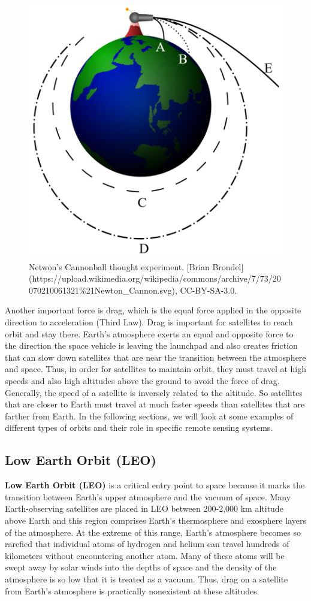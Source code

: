 \documentclass[
]{book}
\begin{document}
\begin{figure}
\includegraphics[width=0.75\linewidth]{images/12-newtons-cannonball} \caption{Netwon's Cannonball thought experiment. [Brian Brondel](https://upload.wikimedia.org/wikipedia/commons/archive/7/73/20070210061321\%21Newton_Cannon.svg), CC-BY-SA-3.0.}\label{fig:12-newtons-cannonball}
\end{figure}

Another important force is drag, which is the equal force applied in the opposite direction to acceleration (Third Law). Drag is important for satellites to reach orbit and stay there. Earth's atmosphere exerts an equal and opposite force to the direction the space vehicle is leaving the launchpad and also creates friction that can slow down satellites that are near the transition between the atmosphere and space. Thus, in order for satellites to maintain orbit, they must travel at high speeds and also high altitudes above the ground to avoid the force of drag. Generally, the speed of a satellite is inversely related to the altitude. So satellites that are closer to Earth must travel at much faster speeds than satellites that are farther from Earth. In the following sections, we will look at some examples of different types of orbits and their role in specific remote sensing systems.

\subsection{Low Earth Orbit (LEO)}\label{low-earth-orbit-leo}

\textbf{Low Earth Orbit (LEO)} is a critical entry point to space because it marks the transition between Earth's upper atmosphere and the vacuum of space. Many Earth-observing satellites are placed in LEO between 200-2,000 km altitude above Earth and this region comprises Earth's thermosphere and exosphere layers of the atmosphere. At the extreme of this range, Earth's atmosphere becomes so rarefied that individual atoms of hydrogen and helium can travel hundreds of kilometers without encountering another atom. Many of these atoms will be swept away by solar winds into the depths of space and the density of the atmosphere is so low that it is treated as a vacuum. Thus, drag on a satellite from Earth's atmosphere is practically nonexistent at these altitudes.
\end{document}
